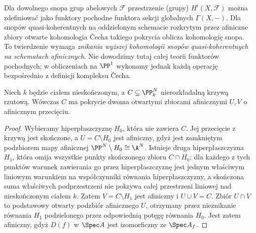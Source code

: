 \begin{uwaga}
Dla dowolnego snopa grup abelowych $\mathcal F$
przestrzenie (grupy) $H^i(X,\mathcal F)$
można zdefiniować jako funktory pochodne funktora
sekcji globalnych $\Gamma(X,-)$. Dla snopów
quasi-koherentnych na oddzielonym schemacie
rozkrytym przez afiniczne zbiory otwarte kohomologia
Čecha takiego pokrycia oblicza kohomologię snopa.
To twierdzenie wymaga \emph{znikania wyższej kohomologii
snopów quasi-koherentnych na schematach afinicznych}.
Nie dowodzimy tutaj całej teorii funktorów pochodnych;
w obliczeniach na $\PP^1$ wykonamy jednak każdą
operację bezpośrednio z definicji kompleksu Čecha.
\end{uwaga}

\begin{stwierdzenie}
Niech $k$ będzie ciałem nieskończonym, a
$C\subseteq\PP^N_k$ nierozkładalną krzywą rzutową.
Wówczas $C$ ma pokrycie dwoma otwartymi zbiorami
afinicznymi $U,V$ o afinicznym przecięciu.
\end{stwierdzenie}
\begin{proof}
Wybieramy hiperpłaszczyznę $H_0$, która nie zawiera
$C$. Jej przecięcie z krzywą jest skończone,
a $U=C\setminus H_0$ jest afiniczny, gdyż
jest zamkniętym podzbiorem mapy afinicznej
$\PP^N\setminus H_0\cong\A^N$.
Istnieje druga hiperpłaszczyzna $H_1$, która
omija wszystkie punkty skończonego zbioru
$C\cap H_0$: dla każdego z tych punktów
warunek zawierania go przez hiperpłaszczyznę
jest jednym właściwym liniowym warunkiem na
współczynniki równania hiperpłaszczyzny,
a skończona suma właściwych podprzestrzeni
nie pokrywa całej przestrzeni liniowej nad
nieskończonym ciałem $k$.
Zatem $V=C\setminus H_1$ jest afiniczny i
$U\cup V=C$. Zbiór $U\cap V$ to podstawowy
otwarty podzbiór afinicznego $U$, otrzymany
przez nieznikanie równania $H_1$ podzielonego
przez odpowiednią potęgę równania $H_0$.
Jest zatem afiniczny, gdyż $D(f)$ w
$\Spec A$ jest izomorficzny ze $\Spec A_f$.
\end{proof}

